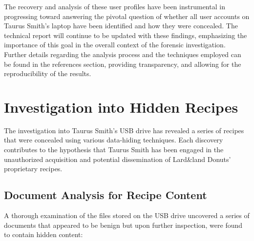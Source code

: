 The recovery and analysis of these user profiles have been instrumental in progressing toward answering the pivotal question of whether all user accounts on Taurus Smith's laptop have been identified and how they were concealed. The technical report will continue to be updated with these findings, emphasizing the importance of this goal in the overall context of the forensic investigation. Further details regarding the analysis process and the techniques employed can be found in the references section, providing transparency, and allowing for the reproducibility of the results.

\section{Investigation into Hidden Recipes}
The investigation into Taurus Smith's USB drive has revealed a series of recipes that were concealed using various data-hiding techniques. Each discovery contributes to the hypothesis that Taurus Smith has been engaged in the unauthorized acquisition and potential dissemination of Lard\&land Donuts' proprietary recipes.

\subsection{Document Analysis for Recipe Content}
A thorough examination of the files stored on the USB drive uncovered a series of documents that appeared to be benign but upon further inspection, were found to contain hidden content:

